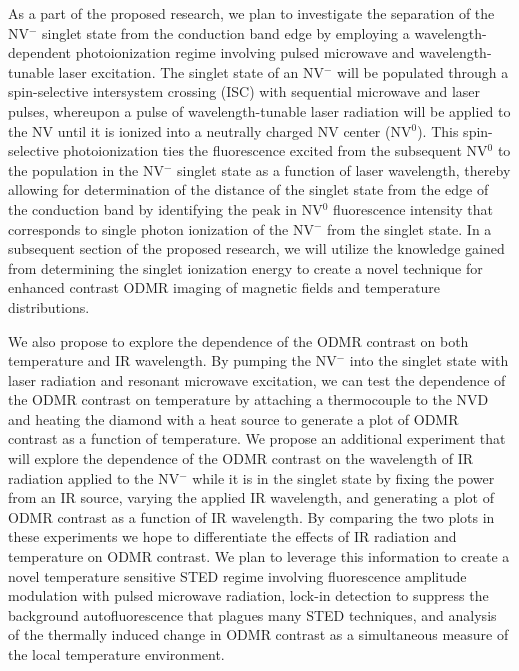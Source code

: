 As a part of the proposed research, we plan to investigate the separation of the NV$^-$ singlet state from the 
conduction band edge by employing a wavelength-dependent photoionization regime involving pulsed microwave and 
wavelength-tunable laser excitation.  The singlet state of an NV$^-$ will be populated through a spin-selective 
intersystem crossing (ISC) with sequential microwave and laser pulses, whereupon a pulse of wavelength-tunable laser 
radiation will be applied to the NV  until it is ionized into a neutrally charged NV center (NV$^0$).  This spin-
selective photoionization ties the fluorescence excited from the subsequent NV$^0$ to the population in the NV$^-$ singlet 
state as a function of laser wavelength, thereby allowing for determination of the distance of the singlet state 
from the edge of the conduction band by identifying the peak in NV$^0$ fluorescence intensity that corresponds to 
single photon ionization of the NV$^-$ from the singlet state.  In a subsequent section of the proposed research, we 
will utilize the knowledge gained from determining the singlet ionization energy to create a novel technique for 
enhanced contrast ODMR imaging of magnetic fields and temperature distributions.

We also propose to explore the dependence of the ODMR contrast on both temperature and IR wavelength.  By pumping 
the NV$^-$ into the singlet state with laser radiation and resonant microwave excitation, we can test the dependence of 
the ODMR contrast on temperature by attaching a thermocouple to the NVD and heating the diamond with a heat source 
to generate a plot of ODMR contrast as a function of temperature.  We propose an additional experiment that will 
explore the dependence of the ODMR contrast on the wavelength of IR radiation applied to the NV$^-$ while it is in the 
singlet state by fixing the power from an IR source, varying the applied IR wavelength, and generating a plot of 
ODMR contrast as a function of IR wavelength.  By comparing the two plots in these experiments we hope to 
differentiate the effects of IR radiation and temperature on ODMR contrast.  We plan to leverage this information to 
create a novel temperature sensitive STED regime involving fluorescence amplitude modulation with pulsed microwave 
radiation, lock-in detection to suppress the background autofluorescence that plagues many STED techniques, and 
analysis of the thermally induced change in ODMR contrast as a simultaneous measure of the local temperature 
environment.

